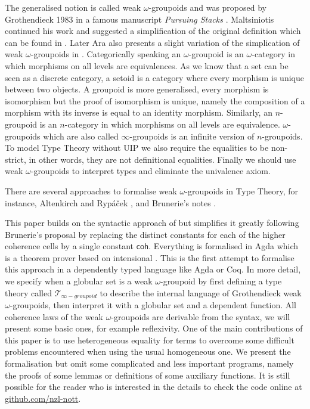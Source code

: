 \documentclass{sig-alternate}
\newcommand{\og}{$\omega$-groupoids}
\newcommand{\wog}{weak $\omega$-groupoids}
\newcommand{\wogs}{weak $\omega$-groupoid} %
\newcommand{\tig}{$\mathcal{T}_{\infty-groupoid}$}
\begin{document}
The generalised notion is called {\wog} and was proposed by
Grothendieck 1983 in a famous manuscript \emph{Pursuing Stacks} \cite{gro:ps}. Maltsiniotis continued his work and suggested a simplification of the original definition which can be found in \cite{mal:gwog}. Later Ara also presents a slight variation of the simplication of {\wog} in \cite{ara:wog}. Categorically speaking an $\omega$-groupoid is an $\omega$-category in which morphisms on all levels are equivalences. As we know that a set can be seen as a discrete
category, a setoid is a category where every morphism is unique between
two objects. A groupoid is more generalised, every morphism is
isomorphism but the proof of isomorphism is unique, namely the composition of a morphism with its inverse is equal to an identity morphism. Similarly, an
$n$-groupoid is an $n$-category in which morphisms on all levels are
equivalence. {\og} which are also called $\infty$-groupoids is an
infinite version of $n$-groupoids. To model Type Theory without UIP we
also require the equalities to be non-strict, in other words, they are
not definitional equalities. Finally we should use {\wog} to interpret types and eliminate the univalence axiom.

There are several approaches to formalise {\wog} in Type Theory, for instance, Altenkirch and Ryp\'a\v{c}ek \cite{txa:csl}, and Brunerie's notes \cite{gb:wog}.

This paper builds on the syntactic approach of
\cite{txa:csl} but simplifies it greatly following Brunerie's proposal
\cite{gb:wog} by replacing the distinct constants for each of the
higher coherence cells by a single constant $\mathsf{coh}$. Everything
is formalised in Agda which is a theorem prover based on intensional
{\mltt}. This is the first attempt to formalise this approach in a
dependently typed language like Agda or Coq. In more detail, we
specify when a globular set is a {\wogs} by first defining a type
theory called {\tig} to describe the internal language of Grothendieck
{\wog}, then interpret it with a globular set and a dependent
function. All coherence laws of the {\wog} are derivable from the
syntax, we will present some basic ones, for example reflexivity. One
of the main contributions of this paper is to use heterogeneous
equality for terms to overcome some difficult problems encountered
when using the usual homogeneous one. We present the formalisation but
omit some complicated and less important programs, namely the
proofs of some lemmas or definitions of some auxiliary functions. It
is still possible for the reader who is interested in the details to
check the code online at \url{github.com/nzl-nott}.  
\end{document}
